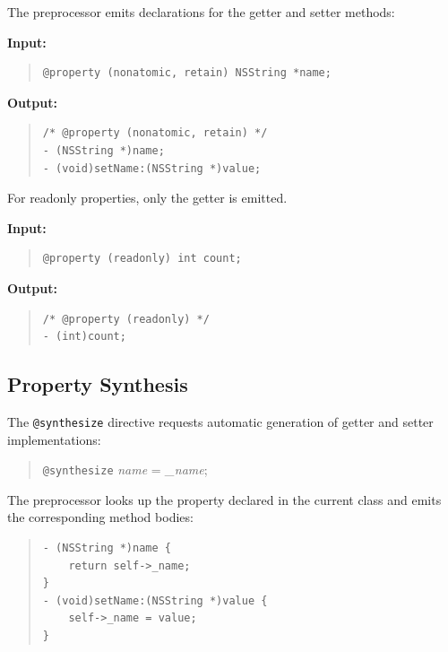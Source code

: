 \documentclass[11pt,twoside]{article}
\newcommand{\meta}[1]{{\itshape #1}}
\begin{document}
The preprocessor emits declarations for the getter and setter methods:

{\bf Input:}
\begin{quote}
\begin{verbatim}
@property (nonatomic, retain) NSString *name;
\end{verbatim}
\end{quote}

{\bf Output:}
\begin{quote}
\begin{verbatim}
/* @property (nonatomic, retain) */
- (NSString *)name;
- (void)setName:(NSString *)value;
\end{verbatim}
\end{quote}

For readonly properties, only the getter is emitted.

{\bf Input:}
\begin{quote}
\begin{verbatim}
@property (readonly) int count;
\end{verbatim}
\end{quote}

{\bf Output:}
\begin{quote}
\begin{verbatim}
/* @property (readonly) */
- (int)count;
\end{verbatim}
\end{quote}

\subsection{Property Synthesis}

The {\tt @synthesize} directive requests automatic generation of getter
and setter implementations:
\begin{quote}
{\tt @synthesize} {\meta{name}} = {\meta{\_name}};
\end{quote}

The preprocessor looks up the property declared in the current class
and emits the corresponding method bodies:
\begin{quote}
\begin{verbatim}
- (NSString *)name {
    return self->_name;
}
- (void)setName:(NSString *)value {
    self->_name = value;
}
\end{verbatim}
\end{quote}
\end{document}
